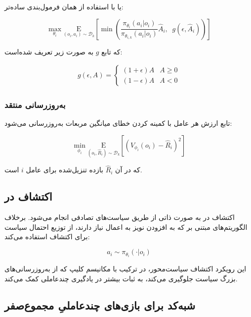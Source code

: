 یا با استفاده از همان فرمول‌بندی ساده‌تر:

\begin{equation}
    \max_{\theta_i} \underset{(o_i,a_i) \sim \mathcal{D}_k}{\mathrm{E}}\left[ \min\left( \frac{\pi_{\theta_i}(a_i|o_i)}{\pi_{\theta_{i,k}}(a_i|o_i)} \hat{A}_i, \;\; g(\epsilon, \hat{A}_i) \right) \right]
\end{equation}

که تابع $g$ به صورت زیر تعریف شده‌است:

\begin{align}
    g(\epsilon, A) = \left\{
    \begin{array}{ll}
        (1 + \epsilon) A & A \geq 0 \\
        (1 - \epsilon) A & A < 0
    \end{array}
    \right.
\end{align}

\subsubsection{به‌روزرسانی منتقد}

تابع ارزش هر عامل با کمینه کردن خطای میانگین مربعات به‌روزرسانی می‌شود:

\begin{equation}
    \min_{\phi_i} \underset{(o_i,\hat{R}_i) \sim \mathcal{D}_k}{\mathrm{E}}\left[ \left( V_{\phi_i}(o_i) - \hat{R}_i \right)^2 \right]
\end{equation}

که در آن $\hat{R}_i$ بازده تنزیل‌شده برای عامل $i$ است.

\subsection{اکتشاف در }

اکتشاف در  به صورت ذاتی از طریق سیاست‌های تصادفی انجام می‌شود. برخلاف الگوریتم‌های مبتنی بر  که به افزودن نویز به اعمال نیاز دارند،  از توزیع احتمال سیاست برای اکتشاف استفاده می‌کند:

\begin{equation}
    a_i \sim \pi_{\theta_i}(\cdot|o_i)
\end{equation}

این رویکرد اکتشاف سیاست‌محور، در ترکیب با مکانیسم کلیپ  که از به‌روزرسانی‌های بزرگ سیاست جلوگیری می‌کند، به ثبات بیشتر در یادگیری چند‌عاملی کمک می‌کند.

\subsection{شبه‌کد  برای بازی‌های چندعاملیِ مجموع­‌صفر}

